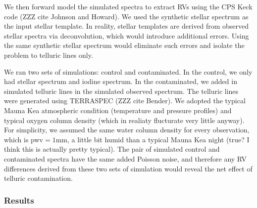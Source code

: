 We then forward model the simulated spectra to extract RVs using the
CPS Keck code (ZZZ cite Johnson and Howard). We used the synthetic
stellar spectrum as the input stellar template. In reality, stellar
templates are derived from observed stellar spectra via deconvolution,
which would introduce additional errors. Using the same synthetic
stellar spectrum would eliminate such errors and isolate the problem
to telluric lines only.

We ran two sets of simulations: control and contaminated. In the
control, we only had stellar spectrum and iodine spectrum. In the
contaminated, we added in simulated telluric lines in the simulated
observed spectrum. The telluric lines were generated using TERRASPEC
(ZZZ cite Bender). We adopted the typical Mauna Kea atmospheric
condition (temperature and pressure profiles) and typical oxygen
column density (which in realiaty flucturate very little anyway). For
simplicity, we assumed the same water column density for every
observation, which is pwv$=1$mm, a little bit humid than a typical
Mauna Kea night (true? I think this is actually pretty typical). The
pair of simulated control and contaminated spectra have the same added
Poisson noise, and therefore any RV differences derived from these two
sets of simulation would reveal the net effect of telluric
contamination.


\subsubsection{Results}

